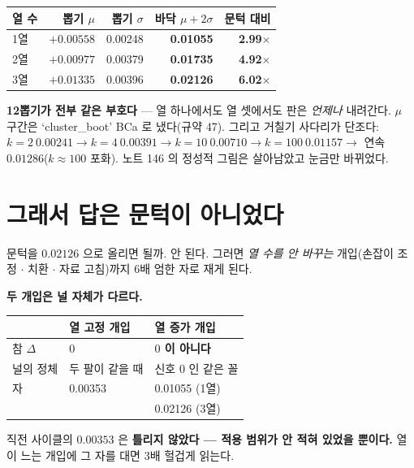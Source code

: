 \documentclass[10pt]{article}
\begin{document}
\begin{center}\small
\begin{tabular}{lrrrr}
\toprule
열 수 & 뽑기 $\mu$ & 뽑기 $\sigma$ & 바닥 $\mu{+}2\sigma$ & 문턱 대비 \\
\midrule
1열 & $+0.00558$ & 0.00248 & \textbf{0.01055} & \textbf{2.99$\times$} \\
2열 & $+0.00977$ & 0.00379 & \textbf{0.01735} & \textbf{4.92$\times$} \\
3열 & $+0.01335$ & 0.00396 & \textbf{0.02126} & \textbf{6.02$\times$} \\
\bottomrule
\end{tabular}
\end{center}

\textbf{12뽑기가 전부 같은 부호다} --- 열 하나에서도 열 셋에서도 판은
\emph{언제나} 내려간다. $\mu$ 구간은 `cluster\_boot' BCa 로 냈다(규약 47).
그리고 거칠기 사다리가 단조다: $k{=}2\ 0.00241 \to k{=}4\ 0.00391 \to
k{=}10\ 0.00710 \to k{=}100\ 0.01157 \to$ 연속 $0.01286$($k{\approx}100$
포화). 노트 146 의 정성적 그림은 살아남았고 눈금만 바뀌었다.


\section{그래서 답은 문턱이 아니었다}

문턱을 $0.02126$ 으로 올리면 될까. 안 된다. 그러면 \emph{열 수를 안 바꾸는}
개입(손잡이 조정 $\cdot$ 치환 $\cdot$ 자료 고침)까지 6배 엄한 자로 재게 된다.

\textbf{두 개입은 널 자체가 다르다.}

\begin{center}\small
\begin{tabular}{lll}
\toprule
 & 열 고정 개입 & 열 증가 개입 \\
\midrule
참 $\Delta$ & $0$ & \textbf{$0$ 이 아니다} \\
널의 정체 & 두 팔이 같을 때 & 신호 $0$ 인 같은 꼴 \\
자 & 0.00353 & 0.01055 (1열) \\
 & & 0.02126 (3열) \\
\bottomrule
\end{tabular}
\end{center}

직전 사이클의 $0.00353$ 은 \textbf{틀리지 않았다 --- 적용 범위가 안 적혀
있었을 뿐이다.} 열이 느는 개입에 그 자를 대면 3배 헐겁게 읽는다.
\end{document}
